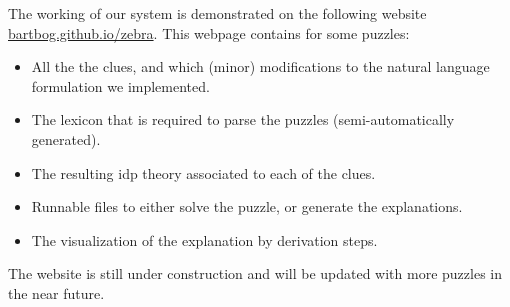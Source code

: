 The working of our system is demonstrated on the following website \url{bartbog.github.io/zebra}. This webpage contains for some puzzles: 
\begin{itemize}
 \item All the the clues, and which (minor) modifications to the natural language formulation we implemented. 
 \item The lexicon that is required to parse the puzzles (semi-automatically generated).
 \item The resulting idp theory associated to each of the clues.
 \item Runnable \idp files to either solve the puzzle, or generate the explanations. 
 \item The visualization of the explanation by derivation steps. 
\end{itemize}
The website is still under construction and will be updated with more puzzles in the near future. 
